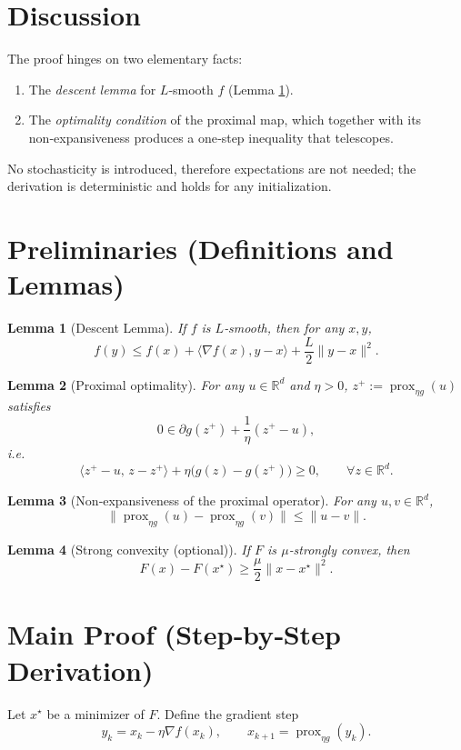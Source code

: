 \documentclass{article}
\newtheorem{lemma}{Lemma}
\newcommand{\prox}{\operatorname{prox}}
\newcommand{\grad}{\nabla}
\begin{document}
\section*{Discussion}
The proof hinges on two elementary facts:
\begin{enumerate}
\item The \emph{descent lemma} for $L$‑smooth $f$ (Lemma \ref{lem:descent}).
\item The \emph{optimality condition} of the proximal map, which together with its non‑expansiveness produces a one‑step inequality that telescopes.
\end{enumerate}
No stochasticity is introduced, therefore expectations are not needed; the derivation is deterministic and holds for any initialization.

\newpage
\section*{Preliminaries (Definitions and Lemmas)}
\begin{lemma}[Descent Lemma]\label{lem:descent}
If $f$ is $L$‑smooth, then for any $x,y$,
\[
f(y)\le f(x)+\langle \grad f(x),y-x\rangle+\frac{L}{2}\|y-x\|^{2}.
\]
\end{lemma}
\begin{lemma}[Proximal optimality]\label{lem:prox_opt}
For any $u\in\mathbb{R}^{d}$ and $\eta>0$, $z^{+}:=\prox_{\eta g}(u)$ satisfies
\[
0\in \partial g(z^{+})+\frac{1}{\eta}(z^{+}-u),
\]
i.e.
\[
\langle z^{+}-u,\,z-z^{+}\rangle +\eta\bigl(g(z)-g(z^{+})\bigr)\ge 0,\qquad \forall z\in\mathbb{R}^{d}.
\]
\end{lemma}
\begin{lemma}[Non‑expansiveness of the proximal operator]\label{lem:nonexp}
For any $u,v\in\mathbb{R}^{d}$,
\[
\|\prox_{\eta g}(u)-\prox_{\eta g}(v)\|\le\|u-v\|.
\]
\end{lemma}
\begin{lemma}[Strong convexity (optional)]\label{lem:strong}
If $F$ is $\mu$‑strongly convex, then
\[
F(x)-F(x^{\star})\ge \frac{\mu}{2}\|x-x^{\star}\|^{2}.
\]
\end{lemma}

\section*{Main Proof (Step‑by‑Step Derivation)}
Let $x^{\star}$ be a minimizer of $F$. Define the gradient step
\[
y_{k}=x_{k}-\eta\grad f(x_{k}),\qquad x_{k+1}= \prox_{\eta g}(y_{k}).
\]
\end{document}
